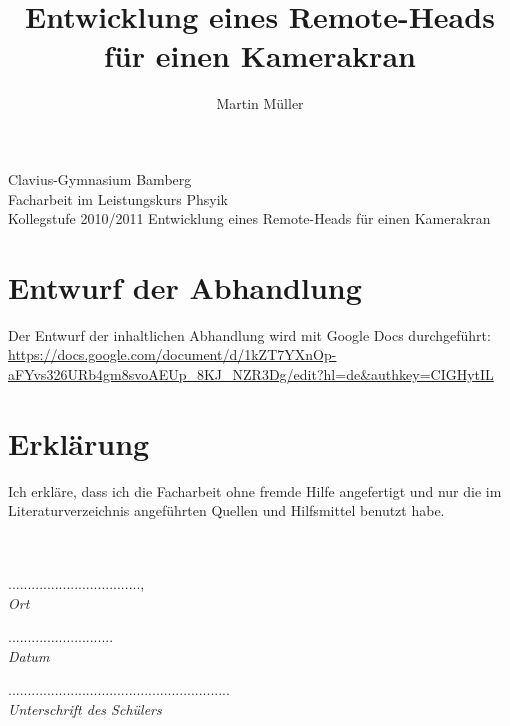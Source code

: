 \documentclass[a4paper, 12pt, bibtotocnumbered, liststotocnumbered]{scrartcl}
\begin{document}
	\title{Entwicklung eines Remote-Heads für einen Kamerakran}
	\author{Martin Müller}

	\begin{center}
		\large{Clavius-Gymnasium Bamberg}\\
		\Large{Facharbeit im Leistungskurs Phsyik}\\
		\large{Kollegstufe 2010/2011}
		\vfill{Entwicklung eines Remote-Heads für einen Kamerakran}
	\end{center}

	\pagebreak

	\tableofcontents

	\pagebreak

	\section{Entwurf der Abhandlung}
	Der Entwurf der inhaltlichen Abhandlung wird mit Google Docs durchgeführt:\\
	\url{https://docs.google.com/document/d/1kZT7YXnOp-aFYvs326URb4gm8svoAEUp_8KJ_NZR3Dg/edit?hl=de&authkey=CIGHytIL}

	\pagebreak

	\nocite{*}
	
	

	\listoffigures

	\pagebreak

	\section*{Erklärung}
	Ich erkläre, dass ich die Facharbeit ohne fremde Hilfe angefertigt und nur die im Literaturverzeichnis angeführten Quellen und Hilfsmittel benutzt habe.
	\\
	\\
	\\
	\begin{minipage}{3cm}
		..................................,\\
		\it{Ort}
	\end{minipage}
	\hspace{1.5cm}
	\begin{minipage}{2cm}
		...........................\\
		\it{Datum}
	\end{minipage}
	\hspace{1.5cm}
	\begin{minipage}{8cm}
		.........................................................\\
		\it{Unterschrift des Schülers}
	\end{minipage}
\end{document}
